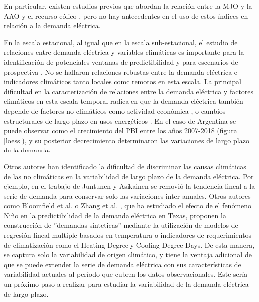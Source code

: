 \documentclass[11pt,a4paper]{article}
\begin{document}
En particular, existen estudios previos que abordan la relación entre la MJO y la AAO y el recurso eólico \cite{lledo2020predicting, bianchi2022assessing}, pero no hay antecedentes en el uso de estos índices en relación a la demanda eléctrica.

En la escala estacional, al igual que en la escala sub-estacional, el estudio de relaciones entre demanda eléctrica y variables climáticas es importante para la identificación de potenciales ventanas de predictibilidad \cite{de2015seasonal,white2017potential, de2019scoping} y para escenarios de prospectiva \cite{eskeland2010electricity}. No se hallaron relaciones robustas entre la demanda eléctrica e indicadores climáticos tanto locales como remotos en esta escala. La principal dificultad en la caracterización de relaciones entre la demanda eléctrica y factores climáticos en esta escala temporal radica en que la demanda eléctrica también depende de factores no climáticos \cite{psiloglou2009factors,khatoon2014effects, cassarino2018impact, paliza2021demanda} como actividad económica \cite{khatoon2014effects, cassarino2018impact}, o cambios estructurales de largo plazo en usos energéticos \cite{detemperatura}. En el caso de Argentina se puede observar como el crecimiento del PBI entre los años 2007-2018 (figura \ref{loess}), y su posterior decrecimiento determinaron las variaciones de largo plazo de la demanda.

Otros autores han identificado la dificultad de discriminar las causas climáticas de las no climáticas en la variabilidad de largo plazo de la demanda eléctrica. Por ejemplo, en el trabajo de Juntunen y Asikainen \cite{juntunen2023electricity} se removió la tendencia lineal a la serie de demanda para conservar solo las variaciones inter-anuales. Otros autores como Bloomfield et al. \cite{bloomfield2016quantifying, bloomfield2018changing} o Zhang et al. \cite{zhang2024potential} , que ha estudiado el efecto de el fenómeno Niño en la predictibilidad de la demanda eléctrica en Texas, proponen la construcción de ''demandas sinteticas'' mediante la utilización de modelos de regresión lineal multiple basados en temperatura o indicadores de requerimientos de climatización como el Heating-Degree y Cooling-Degree Days. De esta manera, se captura solo la variabilidad de origen climático, y tiene la ventaja adicional de que se puede extender la serie de demanda eléctrica con sus características de variabilidad actuales al período que cubren los datos observacionales. Este sería un próximo paso a realizar para estudiar la variabilidad de la demanda eléctrica de largo plazo.
\end{document}
